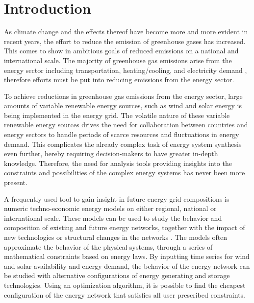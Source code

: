 
\chapter{Introduction}


As climate change and the effects thereof have become more and more evident in recent years, the effort to reduce the emission of greenhouse gases has increased. This comes to show in ambitious goals of reduced emissions on a national and international scale. The majority of greenhouse gas emissions arise from the energy sector including transportation, heating/cooling, and electricity demand \cite{eea_co2_emission}, therefore efforts must be put into reducing emissions from the energy sector. 


To achieve reductions in greenhouse gas emissions from the energy sector, large amounts of variable renewable energy sources, such as wind and solar energy is being implemented in the energy grid. The volatile nature of these variable renewable energy sources drives the need for collaboration between countries and energy sectors to handle periods of scarce resources and fluctuations in energy demand. 
This complicates the already complex task of energy system synthesis even further, hereby requiring decision-makers to have greater in-depth knowledge. Therefore, the need for analysis tools providing insights into the constraints and possibilities of the complex energy systems has never been more present.  

A frequently used tool to gain insight in future energy grid compositions is numeric techno-economic energy models on either regional, national or international scale. These models can be used to study the behavior and composition of existing and future energy networks, together with the impact of new technologies or structural changes in the networks \cite{Gorm_impact_of_CO2_PYPSA}. The models often approximate the behavior of the physical systems, through a series of mathematical constraints based on energy laws. By inputting time series for wind and solar availability and energy demand, the behavior of the energy network can be studied with alternative configurations of energy generating and storage technologies. Using an optimization algorithm, it is possible to find the cheapest configuration of the energy network that satisfies all user prescribed constraints. 

